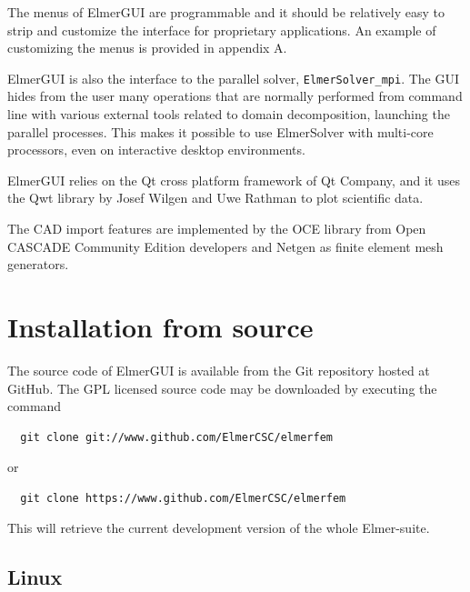 The menus of ElmerGUI are programmable and it should be relatively easy to strip and customize the interface
for proprietary applications. An example of customizing the menus is provided in appendix A.

ElmerGUI is also the interface to the parallel solver,  {\tt ElmerSolver\_mpi}.
The GUI hides from the user many operations that are normally performed from command line with
various external tools related to domain decomposition, launching the parallel processes.
This makes it possible to use ElmerSolver with multi-core processors, even on interactive
desktop environments.

ElmerGUI relies on the Qt cross platform framework of Qt Company\cite{QtHome}, and it uses the Qwt
library by Josef Wilgen and Uwe Rathman\cite{QwtHome} to plot scientific data.

The CAD import features are implemented by the OCE library from Open CASCADE Community Edition developers\cite{OCCHome} 
and Netgen\cite{NetgenHome} as finite element mesh generators.

\chapter{Installation from source}

The source code of ElmerGUI is available from the Git repository hosted at GitHub. The GPL
licensed source code may be downloaded by executing the command 
\begin{verbatim}
  git clone git://www.github.com/ElmerCSC/elmerfem
\end{verbatim}
or
\begin{verbatim}
  git clone https://www.github.com/ElmerCSC/elmerfem
\end{verbatim}
\noindent This will retrieve the current development version of the whole Elmer-suite.

\section{Linux}

